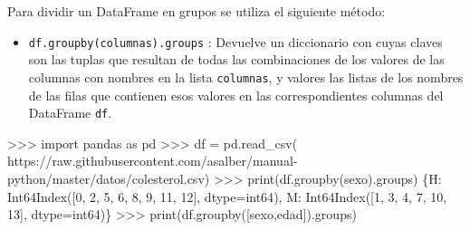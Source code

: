 \documentclass[
  spanish,
  a4paper,
]{scrreport}
\newenvironment{Shaded}{\begin{snugshade}}{\end{snugshade}}
\newcommand{\BuiltInTok}[1]{\textcolor[rgb]{0.00,0.23,0.31}{#1}}
\newcommand{\DecValTok}[1]{\textcolor[rgb]{0.68,0.00,0.00}{#1}}
\newcommand{\ImportTok}[1]{\textcolor[rgb]{0.00,0.46,0.62}{#1}}
\newcommand{\NormalTok}[1]{\textcolor[rgb]{0.00,0.23,0.31}{#1}}
\newcommand{\OperatorTok}[1]{\textcolor[rgb]{0.37,0.37,0.37}{#1}}
\newcommand{\StringTok}[1]{\textcolor[rgb]{0.13,0.47,0.30}{#1}}
\providecommand{\tightlist}{%
  \setlength{\itemsep}{0pt}\setlength{\parskip}{0pt}}
\begin{document}
Para dividir un DataFrame en grupos se utiliza el siguiente método:

\begin{itemize}
\tightlist
\item
  \texttt{df.groupby(columnas).groups} : Devuelve un diccionario con
  cuyas claves son las tuplas que resultan de todas las combinaciones de
  los valores de las columnas con nombres en la lista \texttt{columnas},
  y valores las listas de los nombres de las filas que contienen esos
  valores en las correspondientes columnas del DataFrame \texttt{df}.
\end{itemize}

\begin{Shaded}
\begin{Highlighting}[]
\OperatorTok{\textgreater{}\textgreater{}\textgreater{}} \ImportTok{import}\NormalTok{ pandas }\ImportTok{as}\NormalTok{ pd}
\OperatorTok{\textgreater{}\textgreater{}\textgreater{}}\NormalTok{ df }\OperatorTok{=}\NormalTok{ pd.read\_csv(}
\StringTok{\textquotesingle{}https://raw.githubusercontent.com/asalber/manual{-}python/master/datos/colesterol.csv\textquotesingle{}}\NormalTok{)}
\OperatorTok{\textgreater{}\textgreater{}\textgreater{}} \BuiltInTok{print}\NormalTok{(df.groupby(}\StringTok{\textquotesingle{}sexo\textquotesingle{}}\NormalTok{).groups)}
\NormalTok{\{}\StringTok{\textquotesingle{}H\textquotesingle{}}\NormalTok{: Int64Index([}\DecValTok{0}\NormalTok{, }\DecValTok{2}\NormalTok{, }\DecValTok{5}\NormalTok{, }\DecValTok{6}\NormalTok{, }\DecValTok{8}\NormalTok{, }\DecValTok{9}\NormalTok{, }\DecValTok{11}\NormalTok{, }\DecValTok{12}\NormalTok{], dtype}\OperatorTok{=}\StringTok{\textquotesingle{}int64\textquotesingle{}}\NormalTok{), }\StringTok{\textquotesingle{}M\textquotesingle{}}\NormalTok{: Int64Index([}\DecValTok{1}\NormalTok{, }\DecValTok{3}\NormalTok{, }\DecValTok{4}\NormalTok{, }\DecValTok{7}\NormalTok{, }\DecValTok{10}\NormalTok{, }\DecValTok{13}\NormalTok{], dtype}\OperatorTok{=}\StringTok{\textquotesingle{}int64\textquotesingle{}}\NormalTok{)\}}
\OperatorTok{\textgreater{}\textgreater{}\textgreater{}} \BuiltInTok{print}\NormalTok{(df.groupby([}\StringTok{\textquotesingle{}sexo\textquotesingle{}}\NormalTok{,}\StringTok{\textquotesingle{}edad\textquotesingle{}}\NormalTok{]).groups)}

\end{Highlighting}
\end{Shaded}
\end{document}
